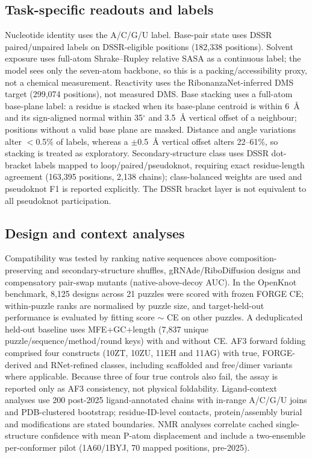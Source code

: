 \subsection{Task-specific readouts and labels}
Nucleotide identity uses the A/C/G/U label. Base-pair state uses DSSR
paired/unpaired labels on DSSR-eligible positions (182,338 positions). Solvent
exposure uses full-atom Shrake--Rupley relative SASA as a continuous label; the
model sees only the seven-atom backbone, so this is a packing/accessibility proxy,
not a chemical measurement. Reactivity uses the RibonanzaNet-inferred DMS target
(299,074 positions), not measured DMS. Base stacking uses a full-atom base-plane
label: a residue is stacked when its base-plane centroid is within 6~\AA{} and its
sign-aligned normal within 35$^\circ$ and 3.5~\AA{} vertical offset of a neighbour;
positions without a valid base plane are masked. Distance and angle variations alter
$<$0.5\% of labels, whereas a $\pm$0.5~\AA{} vertical offset alters 22--61\%, so stacking is treated as
exploratory. Secondary-structure class uses DSSR dot-bracket labels mapped to
loop/paired/pseudoknot, requiring exact residue-length agreement (163,395
positions, 2,138 chains); class-balanced weights are used and pseudoknot F1 is
reported explicitly. The DSSR bracket layer is not equivalent to all pseudoknot
participation.

\subsection{Design and context analyses}
Compatibility was tested by ranking native sequences above composition-preserving
and secondary-structure shuffles, gRNAde/RiboDiffusion designs and compensatory
pair-swap mutants (native-above-decoy AUC). In the OpenKnot benchmark, 8,125
designs across 21 puzzles were scored with frozen FORGE CE; within-puzzle ranks are
normalised by puzzle size, and target-held-out performance is evaluated by fitting
score $\sim$ CE on other puzzles. A deduplicated held-out baseline uses
MFE+GC+length (7,837 unique puzzle/sequence/method/round keys) with and without
CE. AF3 forward folding comprised four constructs (10ZT, 10ZU, 11EH and 11AG) with true,
FORGE-derived and RNet-refined classes, including scaffolded and free/dimer variants
where applicable. Because three of four true controls also fail, the assay is reported
only as AF3 consistency, not physical foldability. Ligand-context analyses
use 200 post-2025 ligand-annotated chains with in-range A/C/G/U joins and
PDB-clustered bootstrap; residue-ID-level contacts, protein/assembly burial and
modifications are stated boundaries. NMR analyses correlate cached single-structure
confidence with mean P-atom displacement and include a two-ensemble per-conformer
pilot (1A60/1BYJ, 70 mapped positions, pre-2025).


